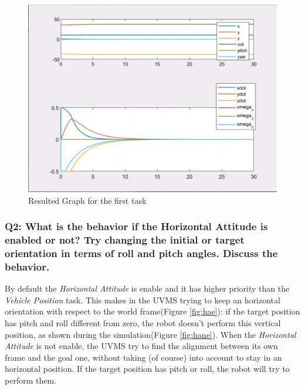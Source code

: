 \documentclass{article}
\begin{document}
\begin{figure}[!h]
    \centering
    \includegraphics[scale=0.5]{111_ppdot.png}
    \caption{Resulted Graph for the first task}
    \label{graph_1_1}
\end{figure}

\subsubsection{Q2: What is the behavior if the Horizontal Attitude is enabled or not? Try changing the initial or target orientation in terms of roll and pitch angles. Discuss the behavior.} 
By default the \textit{Horizontal Attitude} is enable and it has higher priority than the \textit{Vehicle Position} task. 
This makes in the UVMS trying to keep an horizontal orientation with respect to the world frame(Figure  \ref{fig:hae}): if the target position has pitch and roll different from zero, the robot doesn’t perform this vertical position, as shown during the simulation(Figure  \ref{fig:hane}).
When the \textit{Horizontal Attitude} is not enable, the UVMS try to find the alignment between its own frame and the goal one, without taking (of course) into account to stay in an horizontal position. If the target position has pitch or roll, the robot will try to perform them.
\end{document}
